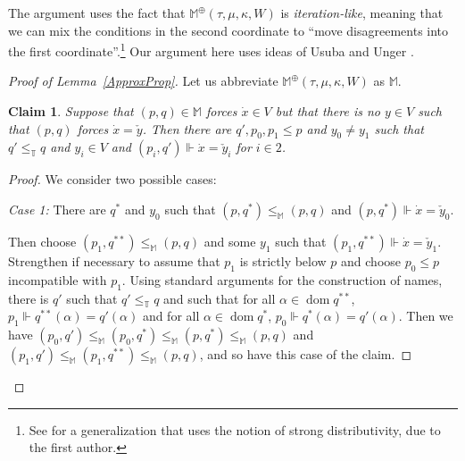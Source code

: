 \documentclass[a4paper]{amsart}
\theoremstyle{definition}
\theoremstyle{remark}
\theoremstyle{plain}
\newtheorem{myclan}[mydef]{Claim}
\numberwithin{mydef}{section}
\DeclareMathOperator{\dom}{dom}
\newcommand{\dM}{\mathbb{M}}
\newcommand{\dQ}{\mathbb{Q}}
\newcommand{\dT}{\mathbb{T}}
\begin{document}
	The argument uses the fact that $\dM^{\oplus}(\tau,\mu,\kappa,W)$ is \emph{iteration-like}, meaning that we can mix the conditions in the second coordinate to ``move disagreements into the first coordinate''.\footnote{See \cite{Jakob2023} for a generalization that uses the notion of strong distributivity, due to the first author.} Our argument here uses ideas of Usuba \cite{Usuba2014} and Unger \cite{Unger2015}. 
		

	\begin{proof}[Proof of Lemma~\ref{ApproxProp}]
	
	Let us abbreviate $\dM^{\oplus}(\tau,\mu,\kappa,W)$ as $\dM$.
	
	
	\begin{myclan}\label{DecisionByP}
		Suppose that $(p,q) \in \dM$ forces $\dot{x}\in V$ but that there is no $y\in V$ such that $(p,q)$ forces $\dot{x}=\check{y}$. Then there are $q',p_0,p_1 \le p$ and $y_0\neq y_1$ such that $q' \le_\dT q$ and $y_i \in V$ and $(p_i,q')\Vdash\dot{x}=\check{y}_i$ for $i\in 2$.
	\end{myclan}
	
	
	\begin{proof}
		We consider two possible cases:



\emph{Case 1:} There are $q^*$ and $y_0$ such that $(p,q^*) \le_{\dM} (p,q)$ and $(p,q^*)\Vdash\dot{x}=\check{y}_0$. 

Then choose $(p_1,q^{**}) \le_{\dM} (p,q)$ and some $y_1$ such that $(p_1,q^{**}) \Vdash \dot{x} = \check{y}_1$. Strengthen if necessary to assume that $p_1$ is strictly below $p$ and choose $p_0 \le p$ incompatible with $p_1$. Using standard arguments for the construction of names, there is $q'$ such that $q' \le_\dT q$ and such that for all $\alpha \in \dom q^{**}$, $p_1 \Vdash q^{**}(\alpha)=q'(\alpha)$ and for all $\alpha \in \dom q^*$, $p_0 \Vdash q^*(\alpha) = q'(\alpha)$. Then we have $(p_0,q') \le_{\dM} (p_0,q^*) \le_{\dM} (p,q^*) \le_{\dM} (p,q)$ and $(p_1,q') \le_{\dM} (p_1,q^{**}) \le_{\dM} (p,q)$, and so have this case of the claim.




\end{proof}
\end{proof}
\end{document}
